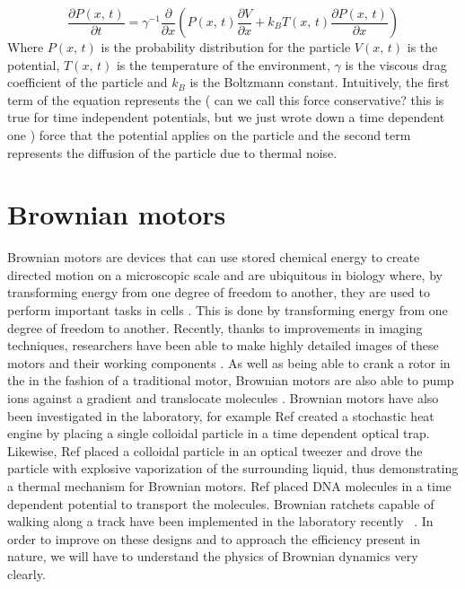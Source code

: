 \begin{equation}
\frac{\partial P(x, \, t)}{\partial t} =  \gamma^{-1} \frac{\partial}{\partial x} \left (P(x, \, t) \frac{\partial V}{\partial x} + k_B T(x,  \, t) \frac{\partial P(x, \, t)}{\partial x} \right )
\end{equation}
Where $P(x, \, t)$ is the probability distribution for the particle $V(x, \, t )$ is the potential, $T(x, \, t)$ is the temperature of the environment, $\gamma$ is the viscous drag coefficient of the particle and $k_B$ is the Boltzmann constant. Intuitively, the first term of the equation represents the {(\color{red} can we call this force conservative? this is true for time independent potentials, but we just wrote down a time dependent one )} force that the potential applies on the particle and the second term represents the diffusion of the particle due to thermal noise.

\section{Brownian motors}
Brownian motors are devices that can use stored chemical energy to create directed motion on a microscopic scale and are ubiquitous in biology where, by transforming energy from one degree of freedom to another, they are used to perform important tasks in cells \cite{PhillipsQuakeMay2006, Magnasco1994,Nelson2014}. This is done by transforming energy from one degree of freedom to another. Recently, thanks to improvements in imaging techniques, researchers have been able to make highly detailed images of these motors and their working components \cite{YiWeiChang2016}. As well as being able to crank a rotor in the in the fashion of a traditional motor, Brownian motors are also able to pump ions against a gradient and translocate molecules \cite{Magnasco1994, Reimann2001, Leibler1993, leibler1990physical}. Brownian motors have also been investigated in the laboratory, for example Ref \cite{BlickleBechinger2011} created a stochastic heat engine by placing a single colloidal particle in a time dependent optical trap. Likewise, Ref \cite{Pedro2014} placed a colloidal particle in an optical tweezer and drove the particle with explosive vaporization of the surrounding liquid, thus demonstrating a thermal mechanism for Brownian motors. Ref \cite{JoelBader1999} placed DNA molecules in a time dependent potential to transport the molecules. Brownian ratchets capable of walking along a track have been implemented in the laboratory recently  ~\cite{Wang2010,DeliusGeertsemaLeigh2010,DeliusGeertsemaLeighEtAl2010}. In order to improve on these designs and to approach the efficiency present in nature, we will have to understand the physics of Brownian dynamics very clearly.

